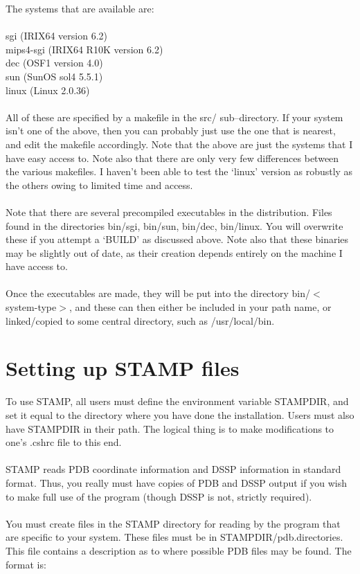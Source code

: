 The systems that are available are:\\
\\
sgi (IRIX64 version 6.2)\\
mips4-sgi (IRIX64 R10K version 6.2)\\
dec (OSF1 version 4.0)\\
sun (SunOS sol4 5.5.1)\\
linux (Linux 2.0.36)\\
\\
All of these are specified by a makefile in the src/ sub--directory.  If your system
isn't one of the above, then you can probably just use the one that is nearest, and edit
the makefile accordingly.  Note that the above are just the systems that I have easy access to. 
Note also that there are only very few differences between the various makefiles.  I haven't
been able to test the `linux' version as robustly as the others owing to limited time and access.\\
\\
Note that there are several precompiled executables in the distribution.  Files
found in the directories bin/sgi, bin/sun, bin/dec, bin/linux.  You will
overwrite these if you attempt a `BUILD' as discussed above.  Note also that these binaries
may be slightly out of date, as their creation depends entirely on 
the machine I have access to.\\
\\
Once the executables are made, they 
will be put into the directory bin/$<$system-type$>$, and these can then either be
included in your path name, or linked/copied to some central 
directory, such as /usr/local/bin.

\section{Setting up STAMP files}

To use STAMP, all users must define the environment variable
STAMPDIR, and set it equal to the directory where you have done
the installation.  Users must also have STAMPDIR in their path. 
The logical thing is to make modifications to one's .cshrc file to
this end.\\
\\
STAMP reads PDB coordinate information and DSSP information in
standard format.  Thus, you really must have copies of PDB
and DSSP output if you wish to make full use of the program
(though DSSP is not, strictly required).\\
\\
You must create files in the STAMP directory for reading by the 
program that are specific to your system.  These files must be in
STAMPDIR/pdb.directories.   This file contains a description as to
where possible PDB files may be found.  The format is:\\

